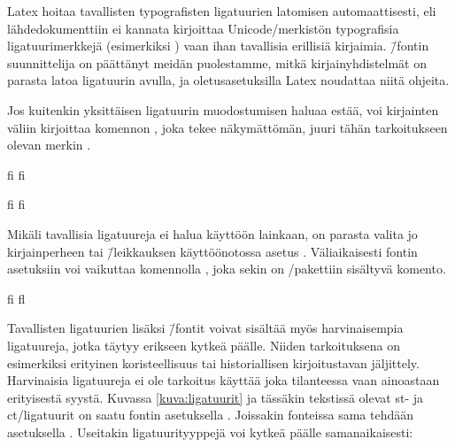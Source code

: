 
Latex hoitaa tavallisten typografisten ligatuurien latomisen
automaattisesti, eli lähdedokumenttiin ei kannata kirjoittaa
Unicode\-/merkistön typografisia ligatuurimerkkejä (esimerkiksi
) vaan ihan tavallisia
erillisiä kirjaimia.  \=/fontin suunnittelija on
päättänyt meidän puolestamme, mitkä kir\-jain\-yh\-dis\-tel\-mät on
parasta latoa ligatuurin avulla, ja ole\-tus\-ase\-tuk\-sil\-la Latex
noudattaa niitä ohjeita.

Jos kuitenkin yksittäisen ligatuurin muodostumisen haluaa estää, voi
kirjainten väliin kirjoittaa komennon , joka tekee näkymättömän, juuri tähän
tarkoitukseen olevan merkin .


\begin{koodilohkosis}
  fi f\textcompwordmark i
\end{koodilohkosis}

\begin{tulossis}
  fi f\textcompwordmark i
\end{tulossis}

Mikäli tavallisia ligatuureja ei halua käyttöön lainkaan, on parasta
valita jo kirjainperheen tai \=/leikkauksen käyttöönotossa asetus
. Väliaikaisesti fontin asetuksiin
voi vaikuttaa komennolla , joka sekin
on \-/pakettiin sisältyvä komento.

\begin{koodilohkosis}
  { fi fl}
\end{koodilohkosis}

Tavallisten ligatuurien lisäksi  \=/fontit voivat
sisältää myös harvinaisempia ligatuureja, jotka täytyy erikseen kytkeä
päälle. Niiden tarkoituksena on esimerkiksi erityinen koristeellisuus
tai historiallisen kirjoitustavan jäljittely. Harvinaisia ligatuureja ei
ole tarkoitus käyttää joka tilanteessa vaan ainoastaan erityisestä
syystä. Kuvassa \ref{kuva:ligatuurit} ja tässäkin tekstissä olevat {%
  \newcommand{\hlig}[1]{{\erikoisfontti
      #1}}%
  \hlig{st}- ja \hlig{ct}\-/ligatuurit%
} on saatu fontin asetuksella .
Joissakin fonteissa sama tehdään asetuksella . Useitakin ligatuurityyppejä voi kytkeä päälle
samanaikaisesti:

